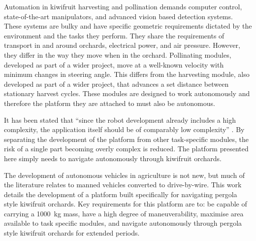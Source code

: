 \documentclass[preprint,authoryear,12pt]{elsarticle}
\begin{document}
    Automation in kiwifruit harvesting and pollination demands computer control, state-of-the-art manipulators, and advanced vision based detection systems.
    These systems are bulky and have specific geometric requirements dictated by the environment and the tasks they perform.
    They share the requirements of transport in and around orchards, electrical power, and air pressure.
    However, they differ in the way they move when in the orchard.
    Pollinating modules, developed as part of a wider project, move at a well-known velocity with minimum changes in steering angle.
    This differs from the harvesting module, also developed as part of a wider project, that advances a set distance between stationary harvest cycles.
    These modules are designed to work autonomously and therefore the platform they are attached to must also be autonomous.

    It has been stated that ``since the robot development already includes a high complexity, the application itself should be of comparably low complexity'' \citep{Ruckelshausen2009}.
    By separating the development of the platform from other task-specific modules, the risk of a single part becoming overly complex is reduced.
    The platform presented here simply needs to navigate autonomously through kiwifruit orchards.

    The development of autonomous vehicles in agriculture is not new, but much of the literature relates to manned vehicles converted to drive-by-wire.
    This work details the development of a platform built specifically for navigating pergola style kiwifruit orchards.
    Key requirements for this platform are to: be capable of carrying a \SI{1000}{\kilo\gram} mass, have a high degree of maneuverability, maximise area available to task specific modules, and navigate autonomously through pergola style kiwifruit orchards for extended periods.
\end{document}
